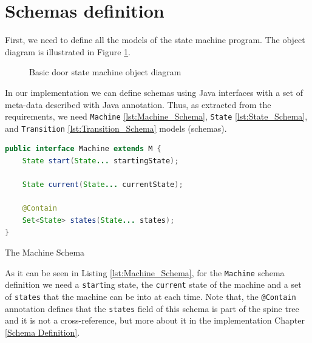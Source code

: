 \section{Schemas definition}
First, we need to define all the models of the state machine program. 
The object diagram is illustrated in Figure \ref{fig:State_machine_object}.

\begin{figure}[H]
	\centering
  	\caption{Basic door state machine object diagram}
  	\label{fig:State_machine_object}
\end{figure}

In our implementation we can define schemas using Java interfaces with a set of meta-data described with Java annotation.
Thus, as extracted from the requirements, we need \texttt{Machine} \ref{lst:Machine_Schema}, \texttt{State} \ref{lst:State_Schema}, and \texttt{Transition} \ref{lst:Transition_Schema} models (schemas).

\begin{sourcecode}[H]
	\begin{lstlisting}[language=Java,escapechar=|]
public interface Machine extends M {
	State start(State... startingState);

	State current(State... currentState);

	@Contain
	Set<State> states(State... states);
}
	\end{lstlisting}
	\caption{The Machine Schema}
	\label{lst:Machine_Schema}
\end{sourcecode}

As it can be seen in Listing \ref{lst:Machine_Schema}, for the \texttt{Machine} schema definition we need a \texttt{start}ing state, the \texttt{current} state of the machine and a set of \texttt{states} that the machine can be into at each time.
Note that, the \texttt{@Contain} annotation defines that the \texttt{states} field of this schema is part of the spine tree and it is not a cross-reference, but more about it in the implementation Chapter \ref{Schema Definition}.

